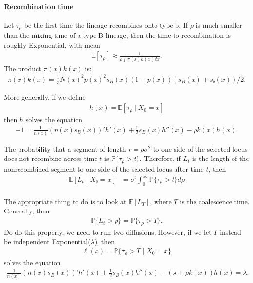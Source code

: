\documentclass{article}
\newcommand{\E}{\mathbb{E}}
\renewcommand{\P}{\mathbb{P}}
\newcommand{\given}{\;\vert\;}
\begin{document}
\paragraph{Recombination time}
Let $\tau_\rho$ be the first time  the lineage recombines onto type b.
If $\rho$ is much smaller than the mixing time of a type B lineage,
then the time to recombination is roughly Exponential,
with mean
\begin{align}
    \E[\tau_\rho] \approx \frac{1}{ \rho \int \pi(x) k(x) dx } .
\end{align}
The product $\pi(x) k(x)$ is:
\begin{align}
    \pi(x) k(x) = \frac{1}{Z} N(x)^2 p(x)^2 s_B(x) (1-p(x)) (s_B(x)+s_b(x))/2 .
\end{align}

More generally, if we define
\begin{align}
    h(x) = \E[\tau_\rho \given X_0 = x]
\end{align}
then $h$ solves the equation
\begin{align}
  -1 = \frac{1}{n(x)}(n(x)s_B(x))' h'(x) + \frac{1}{2} s_B(x) h''(x) - \rho k(x) h(x) .
\end{align}

The probability that a segment of length $r = \rho \sigma^2$ to one side of the selected locus
does not recombine across time $t$ is $\P\{\tau_\rho > t\}$.
Therefore, if $L_t$ is the length of the nonrecombined segment to one side of the selected locus
after time $t$, then
\begin{align}
    \E[ L_t \given X_0=x ] &= \sigma^2 \int_0^\infty \P\{ \tau_\rho > t \} d\rho \\
\end{align}

The appropriate thing to do is to look at $\E[L_T]$, where $T$ is the coalescence time.
Generally, then
\begin{align}
  \P\{ L_t > \rho \} = \P\{ \tau_\rho > T \} .
\end{align}
Do do this properly, we need to run two diffusions.
However, if we let $T$ instead be independent Exponential($\lambda$), then 
\begin{align}
  \ell(x) = \P\{ \tau_\rho > T \given X_0 = x\} 
\end{align}
solves the equation
\begin{align}
  \frac{1}{n(x)}(n(x)s_B(x))' h'(x) + \frac{1}{2} s_B(x) h''(x) - (\lambda + \rho k(x)) h(x) = \lambda .
\end{align}
\end{document}
